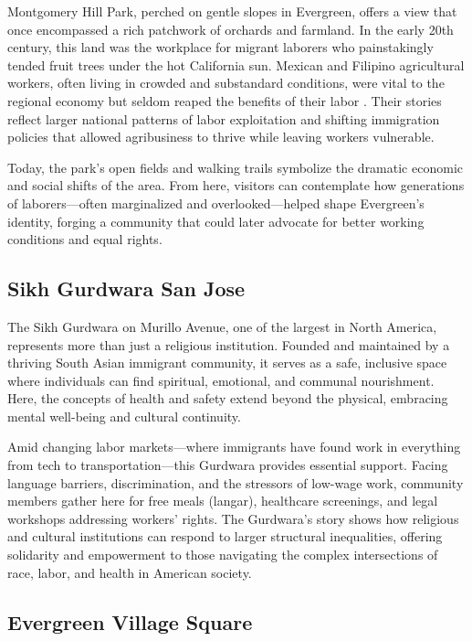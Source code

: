 \documentclass[12pt]{article}
\begin{document}
Montgomery Hill Park, perched on gentle slopes in Evergreen, offers a view that once encompassed a rich patchwork of orchards and farmland. In the early 20th century, this land was the workplace for migrant laborers who painstakingly tended fruit trees under the hot California sun. Mexican and Filipino agricultural workers, often living in crowded and substandard conditions, were vital to the regional economy but seldom reaped the benefits of their labor \cite{J.2018}. Their stories reflect larger national patterns of labor exploitation and shifting immigration policies that allowed agribusiness to thrive while leaving workers vulnerable.

Today, the park’s open fields and walking trails symbolize the dramatic economic and social shifts of the area. From here, visitors can contemplate how generations of laborers—often marginalized and overlooked—helped shape Evergreen’s identity, forging a community that could later advocate for better working conditions and equal rights.

\subsection{Sikh Gurdwara San Jose}

The Sikh Gurdwara on Murillo Avenue, one of the largest in North America, represents more than just a religious institution. Founded and maintained by a thriving South Asian immigrant community, it serves as a safe, inclusive space where individuals can find spiritual, emotional, and communal nourishment. Here, the concepts of health and safety extend beyond the physical, embracing mental well-being and cultural continuity.

Amid changing labor markets—where immigrants have found work in everything from tech to transportation—this Gurdwara provides essential support. Facing language barriers, discrimination, and the stressors of low-wage work, community members gather here for free meals (langar), healthcare screenings, and legal workshops addressing workers’ rights. The Gurdwara’s story shows how religious and cultural institutions can respond to larger structural inequalities, offering solidarity and empowerment to those navigating the complex intersections of race, labor, and health in American society.

\subsection{Evergreen Village Square}
\end{document}
